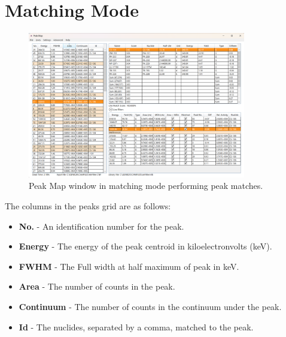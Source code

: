 \documentclass[12pt,report,justified]{SANDreport}
\begin{document}
\section{Matching Mode}\label{sec:match_mode}
\begin{figure}[h]
    \includegraphics[width=0.85\textwidth]{MainWindow.png}
    \centering
    \caption{Peak Map window in matching mode performing peak matches.}
    \label{fig:main_window}
\end{figure}

The columns in the peaks grid are as follows:
\begin{itemize}
    \item \textbf{No.} - An identification number for the peak.
    \item \textbf{Energy} - The energy of the peak centroid in kiloelectronvolts (keV).
    \item \textbf{FWHM} - The Full width at half maximum of peak in keV.
    \item \textbf{Area} - The number of counts in the peak.
    \item \textbf{Continuum} - The number of counts in the continuum under the peak.
    \item \textbf{Id} - The nuclides, separated by a comma, matched to the peak.
\end{itemize}
\end{document}
